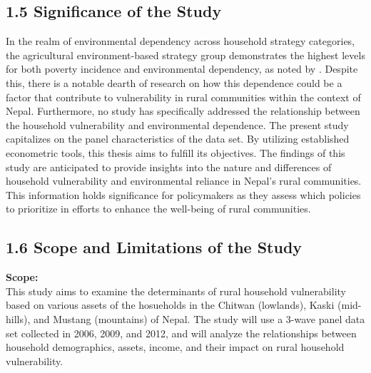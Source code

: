 \documentclass[12pt, a4paper]{article}
\begin{document}
\subsection*{1.5 Significance of the Study}
\renewcommand{\thepage}{\arabic{page}}
In the realm of environmental dependency across household strategy categories, the agricultural environment-based strategy group demonstrates the highest levels for both poverty incidence and environmental dependency, as noted by \cite{walelign2016livelihood}. Despite this, there is a notable dearth of research on how this dependence could be a factor that contribute to vulnerability in rural communities within the context of Nepal. Furthermore, no study has specifically addressed the relationship between the household vulnerability and environmental dependence.
The present study capitalizes on the panel characteristics of the data set. By utilizing established econometric tools, this thesis aims to fulfill its objectives. The findings of this study are anticipated to provide insights into the nature and differences of household vulnerability and environmental reliance in Nepal's rural communities. This information holds significance for policymakers as they assess which policies to prioritize in efforts to enhance the well-being of rural communities.

\subsection*{1.6 Scope and Limitations of the Study}
\renewcommand{\thepage}{\arabic{page}}
\textbf{Scope:}\\
This study aims to examine the determinants of rural household vulnerability based on various assets of the hosueholds in the Chitwan (lowlands), Kaski (mid-hills), and Mustang (mountains)
of Nepal. The study will use a 3-wave panel data set collected in 2006, 2009, and 
2012, and will analyze the relationships between household demographics, assets, 
income, and their impact on rural household vulnerability. \\
\end{document}
